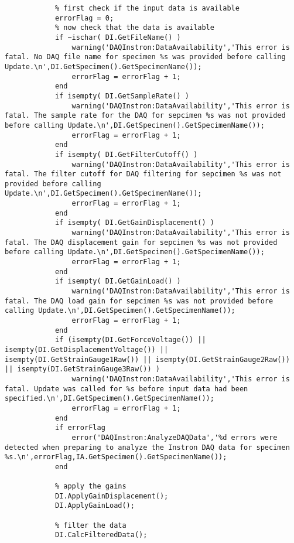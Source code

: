 \begin{lstlisting}
            % first check if the input data is available
            errorFlag = 0; 
            % now check that the data is available
            if ~ischar( DI.GetFileName() )
                warning('DAQInstron:DataAvailability','This error is fatal. No DAQ file name for specimen %s was provided before calling Update.\n',DI.GetSpecimen().GetSpecimenName());
                errorFlag = errorFlag + 1;
            end
            if isempty( DI.GetSampleRate() )
                warning('DAQInstron:DataAvailability','This error is fatal. The sample rate for the DAQ for sepcimen %s was not provided before calling Update.\n',DI.GetSpecimen().GetSpecimenName());
                errorFlag = errorFlag + 1;
            end
            if isempty( DI.GetFilterCutoff() )
                warning('DAQInstron:DataAvailability','This error is fatal. The filter cutoff for DAQ filtering for sepcimen %s was not provided before calling Update.\n',DI.GetSpecimen().GetSpecimenName());
                errorFlag = errorFlag + 1;
            end
            if isempty( DI.GetGainDisplacement() )
                warning('DAQInstron:DataAvailability','This error is fatal. The DAQ displacement gain for sepcimen %s was not provided before calling Update.\n',DI.GetSpecimen().GetSpecimenName());
                errorFlag = errorFlag + 1;
            end
            if isempty( DI.GetGainLoad() )
                warning('DAQInstron:DataAvailability','This error is fatal. The DAQ load gain for sepcimen %s was not provided before calling Update.\n',DI.GetSpecimen().GetSpecimenName());
                errorFlag = errorFlag + 1;
            end
            if (isempty(DI.GetForceVoltage()) || isempty(DI.GetDisplacementVoltage()) || isempty(DI.GetStrainGauge1Raw()) || isempty(DI.GetStrainGauge2Raw()) || isempty(DI.GetStrainGauge3Raw()) )
                warning('DAQInstron:DataAvailability','This error is fatal. Update was called for %s before input data had been specified.\n',DI.GetSpecimen().GetSpecimenName());
                errorFlag = errorFlag + 1;
            end
            if errorFlag
                error('DAQInstron:AnalyzeDAQData','%d errors were detected when preparing to analyze the Instron DAQ data for specimen %s.\n',errorFlag,IA.GetSpecimen().GetSpecimenName());
            end
            
            % apply the gains
            DI.ApplyGainDisplacement();
            DI.ApplyGainLoad();
            
            % filter the data
            DI.CalcFilteredData();
            

\end{lstlisting}

